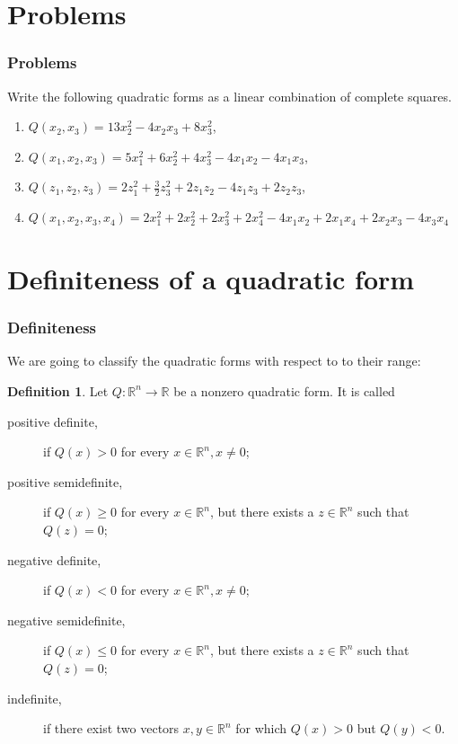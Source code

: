 \documentclass[aspectratio=169,notheorems]{corvinusmetropolis}
\theoremstyle{definition}
\newtheorem{definition}[theorem]{Definition}
\begin{document}
\section{Problems}
\begin{frame}
    \frametitle{Problems}
    \begin{block}{ Write the following quadratic forms as a linear combination of complete squares.}
        \begin{enumerate}
            \item 
            $Q\left( x_2,x_3 \right)=13x_2^2-4x_2x_3+8x_3^2$,
            \item
            $Q\left( x_1,x_2,x_3 \right)=5x_1^2+6x_2^2+4x_3^2-4x_1x_2-4x_1x_3$,
            \item
            $Q\left( z_1,z_2,z_3 \right)=2z_1^2+\frac{3}{2}z_3^2+2z_1z_2-4z_1z_3+2z_2z_3$,
            \item
            $Q\left( x_1,x_2,x_3,x_4 \right)=2x_1^2+2x_2^2+2x_3^2+2x_4^2-4x_1x_2+2x_1x_4+2x_2x_3-4x_3x_4$
        \end{enumerate}
    \end{block}
\end{frame}
\section{Definiteness of a quadratic form}
\begin{frame}
    \frametitle{Definiteness}
    We are going to classify the quadratic forms with respect to to their range:
    \begin{definition}
        Let $Q:\mathbb{R}^n\to\mathbb{R}$ be a nonzero quadratic form. It is called
        \begin{description}
            \item[positive definite,] if $Q\left( x \right)>0$ for every $x\in\mathbb{R}^n,x\neq 0$;
            \item[positive semidefinite,] if $ Q\left( x \right)\geq 0$ for every $x\in\mathbb{R}^n$, 
                but there exists a $z\in\mathbb{R}^n$ such that $Q\left( z \right)=0$;
            \item[negative definite,] if $ Q\left( x \right)<0$ for every $x\in\mathbb{R}^n,x\neq 0;$
            \item[negative semidefinite,] if $ Q\left( x \right)\leq 0$ for every $x\in\mathbb{R}^n$,
                but there exists a $z\in\mathbb{R}^n$ such that $Q\left( z \right)=0$;
            \item[indefinite,] if there exist two vectors $x,y\in\mathbb{R}^n$ for which
                $Q\left( x \right)>0$ but $Q\left( y \right)<0$.
        \end{description}
    \end{definition}
\end{frame}
\end{document}
